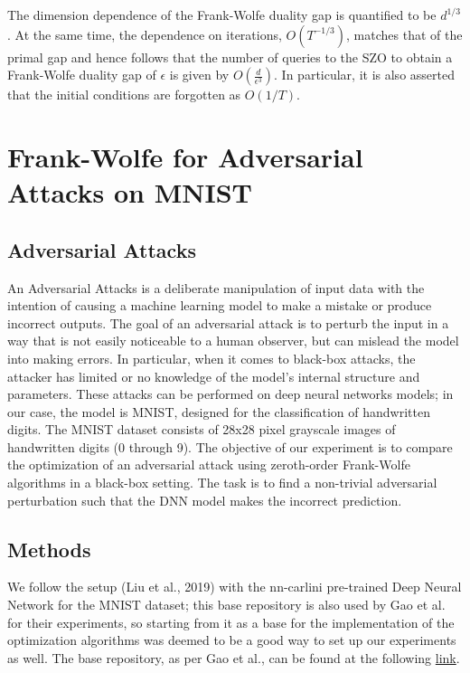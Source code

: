 \documentclass[10pt,twocolumn,letterpaper]{article}
\begin{document}
The dimension dependence of the Frank-Wolfe duality gap is quantified to be $d^{1 / 3}$.
At the same time, the dependence on iterations, $O\left(T^{-1 / 3}\right)$, matches
that of the primal gap and hence follows that the number of queries to the SZO to obtain a Frank-Wolfe 
duality gap of $\epsilon$ is given by $O\left(\frac{d}{\epsilon^{3}}\right)$. 
In particular, it is also asserted that the initial conditions 
are forgotten as $O(1 / T)$.

\section{Frank-Wolfe for Adversarial Attacks on MNIST}

\subsection{Adversarial Attacks}

An Adversarial Attacks is a deliberate manipulation of input data with the 
intention of causing a machine learning model to make a mistake or produce 
incorrect outputs. The goal of an adversarial attack is to perturb 
the input in a way that is not easily noticeable to a human observer,
but can mislead the model into making errors. In particular, when it comes
to black-box attacks, the attacker has limited or no knowledge of the 
model's internal structure and parameters. These attacks can be performed on
deep neural networks models; in our case, the model is MNIST, designed for the
classification of handwritten digits. 
The MNIST dataset consists of 28x28 pixel grayscale images of handwritten digits (0 through 9).
The objective of our experiment is to compare the optimization of an adversarial attack using
zeroth-order Frank-Wolfe algorithms in a black-box setting.
The task is to find a non-trivial adversarial perturbation such that the DNN model
makes the incorrect prediction.

\subsection{Methods}

We follow the setup (Liu et al., 2019) with the nn-carlini pre-trained Deep Neural Network for
the MNIST dataset; this base repository is also used by Gao et al. for their experiments, so starting
from it as a base for the implementation of the optimization algorithms was deemed to be a good
way to set up our experiments as well. The base repository, as per Gao et al., can be found
at the following \href{https://github.com/IBM/ZOSVRG-BlackBox-Adv}{link}.
\end{document}
